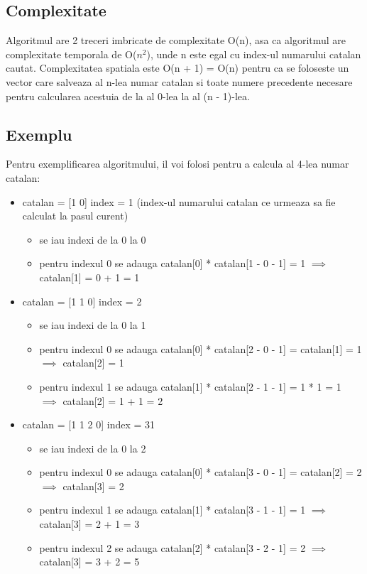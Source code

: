 \documentclass[runningheads]{llncs}
\begin{document}
\subsection{Complexitate}
Algoritmul are 2 treceri imbricate de complexitate O(n), asa ca algoritmul are complexitate temporala de O($n^{2}$), unde n este egal
cu index-ul numarului catalan cautat. Complexitatea spatiala este O(n + 1) = O(n) pentru ca se foloseste un vector care salveaza
al n-lea numar catalan si toate numere precedente necesare pentru calcularea acestuia de la al 0-lea la al (n - 1)-lea.
\subsection{Exemplu}
Pentru exemplificarea algoritmului, il voi folosi pentru a calcula al 4-lea numar catalan:
\begin{itemize}
	\setlength\itemsep{1em}
	\item catalan = [1 0] index = 1 (index-ul numarului catalan ce urmeaza sa fie calculat la pasul curent)
	\begin{itemize}
		\setlength\itemsep{0em}
		\item se iau indexi de la 0 la 0
		\item pentru indexul 0 se adauga catalan[0] * catalan[1 - 0 - 1] = 1 $\implies$ catalan[1] = 0 + 1 = 1
	\end{itemize}

	\item catalan = [1 1 0] index = 2
	\begin{itemize}
		\setlength\itemsep{0em}
		\item se iau indexi de la 0 la 1
		\item pentru indexul 0 se adauga catalan[0] * catalan[2 - 0 - 1] = catalan[1] = 1 $\implies$ catalan[2] = 1
		\item pentru indexul 1 se adauga catalan[1] * catalan[2 - 1 - 1] = 1 * 1 = 1 $\implies$ catalan[2] = 1 + 1 = 2
	\end{itemize}

	\item catalan = [1 1 2 0] index = 31
	\begin{itemize}
		\setlength\itemsep{0em}
		\item se iau indexi de la 0 la 2
		\item pentru indexul 0 se adauga catalan[0] * catalan[3 - 0 - 1] = catalan[2] = 2 $\implies$ catalan[3] = 2
		\item pentru indexul 1 se adauga catalan[1] * catalan[3 - 1 - 1] = 1 $\implies$ catalan[3] = 2 + 1 = 3
		\item pentru indexul 2 se adauga catalan[2] * catalan[3 - 2 - 1] = 2 $\implies$ catalan[3] = 3 + 2 = 5
	\end{itemize}


\end{itemize}
\end{document}
